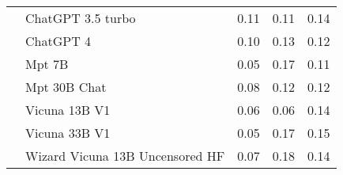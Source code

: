 \begin{table}[!htbp]
\begin{tabular}{l|l|rrr}
&ChatGPT 3.5 turbo & {\cellcolor[HTML]{A29FCB}} \color[HTML]{F1F1F1} 0.11 & {\cellcolor[HTML]{A09DCA}} \color[HTML]{F1F1F1} 0.11 & {\cellcolor[HTML]{6E58A7}} \color[HTML]{F1F1F1} 0.14 \\
&ChatGPT 4 & {\cellcolor[HTML]{BEBEDD}} \color[HTML]{000000} 0.10 & {\cellcolor[HTML]{8885BE}} \color[HTML]{F1F1F1} 0.13 & {\cellcolor[HTML]{8B87BF}} \color[HTML]{F1F1F1} 0.12 \\
&Mpt 7B & {\cellcolor[HTML]{FCFBFD}} \color[HTML]{000000} 0.05 & {\cellcolor[HTML]{440A82}} \color[HTML]{F1F1F1} 0.17 & {\cellcolor[HTML]{A4A1CC}} \color[HTML]{F1F1F1} 0.11 \\
&Mpt 30B Chat & {\cellcolor[HTML]{E0DFEE}} \color[HTML]{000000} 0.08 & {\cellcolor[HTML]{9B97C6}} \color[HTML]{F1F1F1} 0.12 & {\cellcolor[HTML]{9692C4}} \color[HTML]{F1F1F1} 0.12 \\
&Vicuna 13B V1 & {\cellcolor[HTML]{F4F3F8}} \color[HTML]{000000} 0.06 & {\cellcolor[HTML]{F2F0F7}} \color[HTML]{000000} 0.06 & {\cellcolor[HTML]{796EB2}} \color[HTML]{F1F1F1} 0.14 \\
&Vicuna 33B V1 & {\cellcolor[HTML]{FCFBFD}} \color[HTML]{000000} 0.05 & {\cellcolor[HTML]{4D1A89}} \color[HTML]{F1F1F1} 0.17 & {\cellcolor[HTML]{65479E}} \color[HTML]{F1F1F1} 0.15 \\
&Wizard Vicuna 13B Uncensored HF & {\cellcolor[HTML]{EFEDF5}} \color[HTML]{000000} 0.07 & {\cellcolor[HTML]{3F007D}} \color[HTML]{F1F1F1} 0.18 & {\cellcolor[HTML]{7970B3}} \color[HTML]{F1F1F1} 0.14 \\
\bottomrule
    \end{tabular}
            
\end{table}

